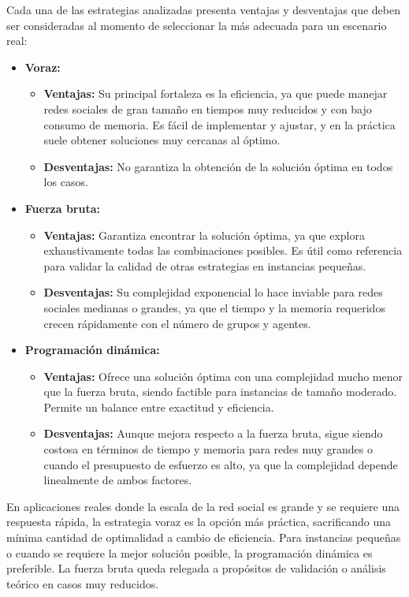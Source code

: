 Cada una de las estrategias analizadas presenta ventajas y desventajas que deben ser consideradas al momento de seleccionar la más adecuada para un escenario real:

\begin{itemize}
	\item \textbf{Voraz:}
	\begin{itemize}
		\item \textbf{Ventajas:} Su principal fortaleza es la eficiencia, ya que puede manejar redes sociales de gran tamaño en tiempos muy reducidos y con bajo consumo de memoria. Es fácil de implementar y ajustar, y en la práctica suele obtener soluciones muy cercanas al óptimo.

		\item \textbf{Desventajas:} No garantiza la obtención de la solución óptima en todos los casos.
	\end{itemize}

	\item \textbf{Fuerza bruta:}
	\begin{itemize}
		\item \textbf{Ventajas:} Garantiza encontrar la solución óptima, ya que explora exhaustivamente todas las combinaciones posibles. Es útil como referencia para validar la calidad de otras estrategias en instancias pequeñas.

		\item \textbf{Desventajas:} Su complejidad exponencial lo hace inviable para redes sociales medianas o grandes, ya que el tiempo y la memoria requeridos crecen rápidamente con el número de grupos y agentes.
	\end{itemize}

	\item \textbf{Programación dinámica:}
	\begin{itemize}
		\item \textbf{Ventajas:} Ofrece una solución óptima con una complejidad mucho menor que la fuerza bruta, siendo factible para instancias de tamaño moderado. Permite un balance entre exactitud y eficiencia.

		\item \textbf{Desventajas:} Aunque mejora respecto a la fuerza bruta, sigue siendo costosa en términos de tiempo y memoria para redes muy grandes o cuando el presupuesto de esfuerzo es alto, ya que la complejidad depende linealmente de ambos factores.
	\end{itemize}
\end{itemize}

En aplicaciones reales donde la escala de la red social es grande y se requiere una respuesta rápida, la estrategia voraz es la opción más práctica, sacrificando una mínima cantidad de optimalidad a cambio de eficiencia. Para instancias pequeñas o cuando se requiere la mejor solución posible, la programación dinámica es preferible. La fuerza bruta queda relegada a propósitos de validación o análisis teórico en casos muy reducidos.


